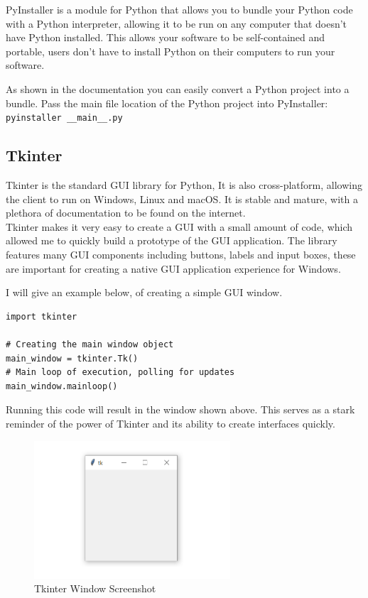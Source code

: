 PyInstaller \cite{pyinstaller} is a module for Python that allows you to bundle your
Python code with a Python interpreter, allowing it to be run on any computer
that doesn't have Python installed.
This allows your software to be self-contained and portable,
users don't have to install Python on their computers to run your software.

As shown in the documentation you can easily
convert a Python project into a bundle. \cite{pyinstaller}
Pass the main file location of the Python project into PyInstaller: \\
\texttt{pyinstaller \_\_main\_\_.py}

\subsection{Tkinter}
Tkinter \cite{tkinter} is the standard GUI library for Python,
It is also cross-platform, allowing the client to run on Windows, Linux and macOS.
It is stable and mature, with a plethora of documentation to be found on the internet. \\

Tkinter makes it very easy to create a GUI with a small amount of code,
which allowed me to quickly build a prototype of the GUI application.
The library features many GUI components including buttons, labels and input boxes,
these are important for creating a native GUI application experience for Windows.

I will give an example below, of creating a simple GUI window.

\begin{lstlisting}
import tkinter

# Creating the main window object
main_window = tkinter.Tk()
# Main loop of execution, polling for updates
main_window.mainloop()
\end{lstlisting}

Running this code will result in the window shown above.
This serves as a stark reminder of the power of Tkinter
and its ability to create interfaces quickly.

\begin{figure}[h!]
    \centering
    \label{image:tkinterWindowScreenshot}
    \includegraphics[width=0.65\textwidth]{images/screenshots/tkinter}
    \caption{Tkinter Window Screenshot}
\end{figure}

